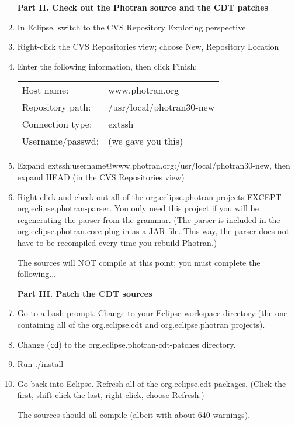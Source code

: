 \begin{enumerate}
\vspace{.5em}
\noindent\textbf{Part II.  Check out the Photran source and the CDT patches}

\item In Eclipse, switch to the CVS Repository Exploring perspective.
\item Right-click the CVS Repositories view; choose New, Repository Location
\item Enter the following information, then click Finish: \\
\begin{tabular}{ll}
        Host name:       & www.photran.org \\
        Repository path: & /usr/local/photran30-new \\
        Connection type: & extssh \\
        Username/passwd: & (we gave you this) \\
\end{tabular}
\item Expand extssh:username@www.photran.org:/usr/local/photran30-new,
    then expand HEAD (in the CVS Repositories view)
\item{Right-click and check out all of the org.eclipse.photran projects EXCEPT
    org.eclipse.photran-parser.
    You only need this project if you will be regenerating the parser from the
    grammar.  (The parser is included in the org.eclipse.photran.core plug-in
    as a JAR file.  This way, the parser does not have to be recompiled
    every time you rebuild Photran.)}

The sources will NOT compile at this point; you must complete the following...

\vspace{.5em}
\noindent\textbf{Part III.  Patch the CDT sources}

\item Go to a bash prompt.  Change to your Eclipse workspace directory
    (the one containing all of the org.eclipse.cdt and
    org.eclipse.photran projects).
\item Change (\texttt{cd}) to the org.eclipse.photran-cdt-patches directory.
\item Run ./install
\item{Go back into Eclipse.  Refresh all of the org.eclipse.cdt packages.
    (Click the first, shift-click the last, right-click, choose Refresh.)}

The sources should all compile (albeit with about 640 warnings).
\end{enumerate}
